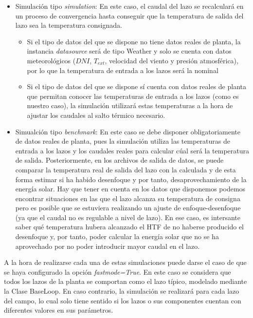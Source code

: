 \begin{itemize}
\item
  Simulación tipo \emph{simulation}: En este caso, el caudal del lazo se   recalculará en un proceso de convergencia hasta conseguir que la   temperatura de salida del lazo sea la temperatura consignada.

  \begin{itemize}
  \item
    Si el tipo de datos del que se dispone no tiene datos reales de  planta, la instancia \emph{datasource} será de tipo Weather y solo   se cuenta con datos meteorológicos (\(DNI\), \(T_{ext}\), velocidad
    del viento y presión atmosférica), por lo que la temperatura de   entrada a los lazos será la nominal
  \item
    Si el tipo de datos del que se dispone sí cuenta con datos reales de   planta que permitan conocer las temperaturas de entrada a los lazos  (como es nuestro caso), la simulación utilizará estas temperaturas a  la hora de ajustar los caudales al salto térmico necesario.
  \end{itemize}
\item
  Simualción tipo \emph{benchmark}: En este caso se debe disponer  obligatoriamente de datos reales de planta, pues la simulación utiliza  las temperaturas de entrada a los lazos y los caudales reales para calcular cúal será la temperatura de salida. Posteriormente, en los  archivos de salida de datos, se puede comparar la temperatura real de  salida del lazo con la calculada y de esta forma estimar si ha habido desenfoque y por tanto, desaprovechamiento de la energía solar. Hay
  que tener en cuenta en los datos que disponemos podemos encontrar   situaciones en las que el lazo alcanza su temperatura de consigna pero   es posible que se estuviera realizando un ajuste de enfoque-desenfoque   (ya que el caudal no es regulable a nivel de lazo). En ese caso, es   intersante saber qué temperatura hubera alcanzado el HTF de no haberse   producido el desenfoque y, por tanto, poder calcular la energía solar   que no se ha aprovechado por no poder introducir mayor caudal en el   lazo.
\end{itemize}

A la hora de realizarse cada una de estas simulaciones puede darse el caso de que se haya configurado la opción \emph{fastmode=True}. En este caso se considera que todos los lazos de la planta se comportan como el lazo típico, modelado mediante la Clase BaseLoop. En caso contrario, la simulación se realizará para cada lazo del campo, lo cual solo tiene sentido si los lazos o sus componentes cuentan con diferentes valores en sus parámetros. 

